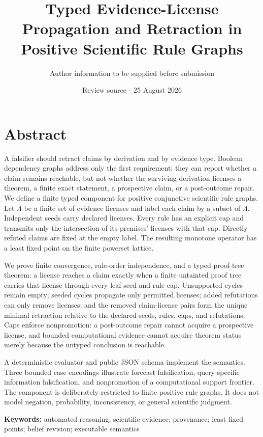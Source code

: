 \documentclass[
  11pt,
]{article}
\title{Typed Evidence-License Propagation and Retraction in Positive Scientific Rule Graphs}
\author{Author information to be supplied before submission}
\date{Review source - 25 August 2026}
\begin{document}
\maketitle

\hypertarget{abstract}{%
\section{Abstract}\label{abstract}}

A falsifier should retract claims by derivation and by evidence type.
Boolean dependency graphs address only the first requirement: they can
report whether a claim remains reachable, but not whether the surviving
derivation licenses a theorem, a finite exact statement, a prospective
claim, or a post-outcome repair. We define a finite typed component for
positive conjunctive scientific rule graphs. Let \(\Lambda\) be a finite
set of evidence licenses and label each claim by a subset of
\(\Lambda\). Independent seeds carry declared licenses. Every rule has
an explicit cap and transmits only the intersection of its premises'
licenses with that cap. Directly refuted claims are fixed at the empty
label. The resulting monotone operator has a least fixed point on the
finite powerset lattice.

We prove finite convergence, rule-order independence, and a typed
proof-tree theorem: a license reaches a claim exactly when a finite
untainted proof tree carries that license through every leaf seed and
rule cap. Unsupported cycles remain empty; seeded cycles propagate only
permitted licenses; added refutations can only remove licenses; and the
removed claim-license pairs form the unique minimal retraction relative
to the declared seeds, rules, caps, and refutations. Caps enforce
nonpromotion: a post-outcome repair cannot acquire a prospective
license, and bounded computational evidence cannot acquire theorem
status merely because the untyped conclusion is reachable.

A deterministic evaluator and public JSON schema implement the
semantics. Three bounded case encodings illustrate forecast
falsification, query-specific information falsification, and
nonpromotion of a computational support frontier. The component is
deliberately restricted to finite positive rule graphs. It does not
model negation, probability, inconsistency, or general scientific
judgment.

\textbf{Keywords:} automated reasoning; scientific evidence; provenance;
least fixed points; belief revision; executable semantics
\end{document}
